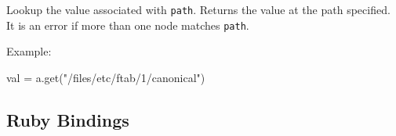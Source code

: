 Lookup the value associated with \verb!path!. Returns the value at the path specified. It is an error if more than one node matches \verb!path!.

Example:

\begin{python}[]
    val = a.get("/files/etc/ftab/1/canonical")
\end{python}

\subsection{Ruby Bindings}





